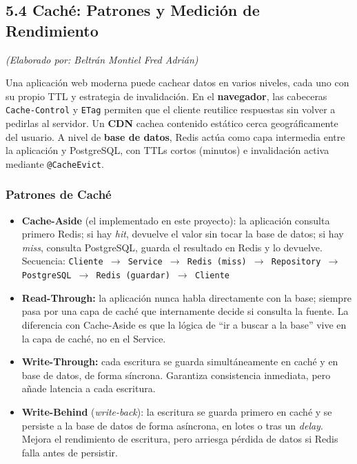 \documentclass[12pt]{article}
\begin{document}
	\subsection{5.4 Caché: Patrones y Medición de Rendimiento}
	\textit{(Elaborado por: Beltrán Montiel Fred Adrián)}
	
	Una aplicación web moderna puede cachear datos en varios niveles, cada uno con su propio TTL y estrategia de invalidación. En el \textbf{navegador}, las cabeceras \texttt{Cache-Control} y \texttt{ETag} permiten que el cliente reutilice respuestas sin volver a pedirlas al servidor. Un \textbf{CDN} cachea contenido estático cerca geográficamente del usuario. A nivel de \textbf{base de datos}, Redis actúa como capa intermedia entre la aplicación y PostgreSQL, con TTLs cortos (minutos) e invalidación activa mediante \texttt{@CacheEvict}.
	
	\subsubsection*{Patrones de Caché}
	
	\begin{itemize}
		\item \textbf{Cache-Aside} (el implementado en este proyecto): la aplicación consulta primero Redis; si hay \textit{hit}, devuelve el valor sin tocar la base de datos; si hay \textit{miss}, consulta PostgreSQL, guarda el resultado en Redis y lo devuelve. \\
		Secuencia: \texttt{Cliente $\rightarrow$ Service $\rightarrow$ Redis (miss) $\rightarrow$ Repository $\rightarrow$ PostgreSQL $\rightarrow$ Redis (guardar) $\rightarrow$ Cliente}
		
		\item \textbf{Read-Through:} la aplicación nunca habla directamente con la base; siempre pasa por una capa de caché que internamente decide si consulta la fuente. La diferencia con Cache-Aside es que la lógica de ``ir a buscar a la base'' vive en la capa de caché, no en el Service.
		
		\item \textbf{Write-Through:} cada escritura se guarda simultáneamente en caché y en base de datos, de forma síncrona. Garantiza consistencia inmediata, pero añade latencia a cada escritura.
		
		\item \textbf{Write-Behind} (\textit{write-back}): la escritura se guarda primero en caché y se persiste a la base de datos de forma asíncrona, en lotes o tras un \textit{delay}. Mejora el rendimiento de escritura, pero arriesga pérdida de datos si Redis falla antes de persistir.
	\end{itemize}
	
\end{document}
